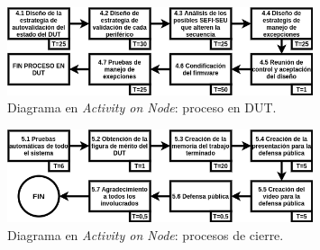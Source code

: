 \documentclass[
11pt, %
]{charter}
\begin{document}
\begin{figure}[htpb]
	\centering 
	\includegraphics[width=0.8\textwidth]{./Figuras/AoN4.png}
	\caption{Diagrama en \textit{Activity on Node}: proceso en DUT.}
	\label{fig:AoN4}
\end{figure}

\begin{figure}[htpb]
	\centering 
	\includegraphics[width=0.8\textwidth]{./Figuras/AoN5.png}
	\caption{Diagrama en \textit{Activity on Node}: procesos de cierre.}
	\label{fig:AoN5}
\end{figure}
\end{document}
